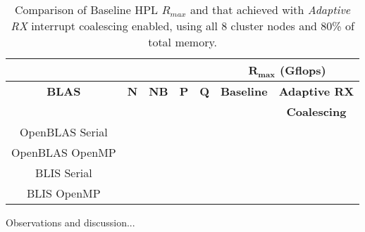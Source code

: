 \begin{table}[H]
\begin{center}
\begin{tabular}{ |c|c|c|c|c|c|c| } 
\hline
\multicolumn{5}{|c}{} & \multicolumn{2}{|c|}{$\mathbf{R_{max}}$ \textbf{(Gflops)}} \\
\hline
\textbf{BLAS} & \textbf{N} & \textbf{NB} & \textbf{P} & \textbf{Q} & \textbf{Baseline}  & \textbf{Adaptive RX}  \\
              &            &             &            &            &                    & \textbf{Coalescing} \\
\hline
OpenBLAS Serial &  &  &  &  &  &  \\
\hline
OpenBLAS OpenMP &  &  &  &  &  &  \\
\hline
BLIS Serial     &  &  &  &  &  &  \\
\hline
BLIS OpenMP     &  &  &  &  &  &  \\
\hline
\end{tabular}
\end{center}
\caption{\label{tab:table-name}Comparison of Baseline HPL $R_{max}$ and that achieved with \emph{Adaptive RX} interrupt coalescing enabled, using all 8 cluster nodes and 80\% of total memory.}
\end{table}

Observations and discussion...



